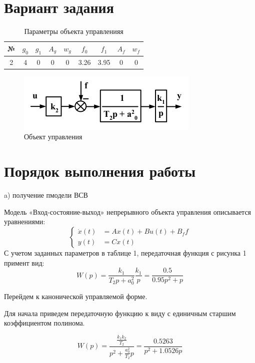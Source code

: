 \documentclass[a4paper,14pt]{extreport}
\begin{document}
	\section{Вариант задания}
	
\begin{table}[H]
	\centering
	\caption{Параметры объекта управленияя}
	\label{my-label}
	\begin{tabular}{|c|c|c|c|c|c|c|c|c|}
		\hline
		№ & $g_0$ & $g_1$ & $A_g$ & $w_g$ & $f_0$ & $f_1$ & $A_f$ & $w_f$ \\ \hline
		2 & 4     & 0     & 0     & 0     & 3.26   & 3.95   & 0     & 0     \\ \hline
	\end{tabular}
\end{table}
	
	\begin{figure}[H]
		\center\includegraphics[width=0.5\linewidth]{pf.png}
		\caption{Объект управления}
		\label{fig:scr1}
	\end{figure}
	
	\section{Порядок выполнения работы}
	a) получение пмодели ВСВ
	
		Модель «Вход-состояние-выход» непрерывного объекта управления описывается уравнениями:
	\begin{equation}
	\begin{cases}
	\dot x(t) &= A x(t) + B u(t) + B_f f\\
	y(t) &= C x(t)
	\end{cases}
	\end{equation}
	С учетом заданных параметров в таблице 1, передаточная функция с рисунка 1 примент вид:
	\begin{equation}
		W(p) = \frac{k_1}{T_2 p + a_0^2} \frac{k_1}{p} =\frac{0.5}{0.95 p^2 + p} 
	\end{equation}

	Перейдем к канонической управляемой форме.

Для начала приведем передаточную функцию к виду с единичным старшим коэффициентом полинома.

\begin{equation}
W(p) = \frac{\frac{k_1 k_2}{T_2}}{p^2 + \frac{a_0^2}{T_2} p} = \frac{0.5263}{p^2 + 1.0526  p} 
\end{equation}
\end{document}
